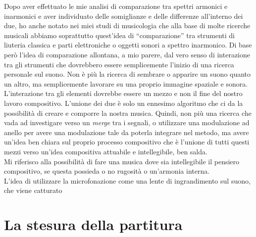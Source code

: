 Dopo aver effettuato le mie analisi di comparazione tra spettri armonici e inarmonici e aver individuato delle somiglianze e delle differenze all’interno dei due, ho anche notato nei miei studi di musicologia che alla base di molte ricerche musicali abbiamo soprattutto quest’idea di “comparazione” tra strumenti di liuteria classica e parti elettroniche o oggetti sonori a spettro inarmonico. Di base però l’idea di comparazione allontana, a mio parere, dal vero senso di interazione tra gli strumenti che dovrebbero essere semplicemente l’inizio di una ricerca personale sul suono. Non è più la ricerca di sembrare o apparire un suono quanto un altro, ma semplicemente lavorare su una proprio immagine spaziale e sonora. \\
L’interazione tra gli elementi dovrebbe essere un mezzo e non il fine del nostro lavoro compositivo. L’unione dei due è solo un ennesimo algoritmo che ci da la possibilità di creare e comporre la nostra musica. Quindi, non più una ricerca che vada ad investigare verso un \textit{merge} tra i segnali, o utilizzare una modulazione ad anello per avere una modulazione tale da poterla integrare nel metodo, ma avere un’idea ben chiara sul proprio processo compositivo che è l’unione di tutti questi mezzi verso un’idea compositiva attuabile e intellegibile, ben salda. \\
Mi riferisco alla possibilità di fare una musica dove sia intellegibile il pensiero compositivo, se questa possieda o no rugosità o un’armonia interna. \\
L’idea di utilizzare la microfonazione come una lente di ingrandimento sul suono, che viene catturato 

\section{La stesura della partitura}

